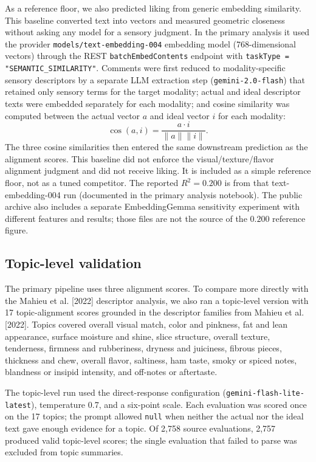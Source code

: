 \documentclass[11pt]{article}
\begin{document}
As a reference floor, we also predicted liking from generic embedding
similarity. This baseline converted text into vectors and measured geometric
closeness without asking any model for a sensory judgment. In the primary
analysis it used the provider \texttt{models/text-embedding-004} embedding
model (768-dimensional vectors) through the REST
\texttt{batchEmbedContents} endpoint with
\texttt{taskType = "SEMANTIC\_SIMILARITY"}. Comments were first reduced to
modality-specific sensory descriptors by a separate LLM extraction step
(\texttt{gemini-2.0-flash}) that retained only sensory terms for the target
modality; actual and ideal descriptor texts were embedded separately for each
modality; and cosine similarity was computed between the actual vector $a$ and
ideal vector $i$ for each modality:
\[
\cos(a,i) = \frac{a \cdot i}{\lVert a \rVert \lVert i \rVert}.
\]
The three cosine similarities then entered the same downstream prediction as
the alignment scores. This baseline did not enforce the visual/texture/flavor
alignment judgment and did not receive liking. It is included as a simple
reference floor, not as a tuned competitor. The reported $R^2 = 0.200$ is from
that text-embedding-004 run (documented in the primary analysis notebook). The
public archive also includes a separate EmbeddingGemma sensitivity experiment
with different features and results; those files are not the source of the
$0.200$ reference figure.

\subsection{Topic-level validation}
\label{sec:topicmethods}

The primary pipeline uses three alignment scores. To compare more directly
with the Mahieu et al. [2022] descriptor analysis, we also ran a topic-level
version with 17 topic-alignment scores grounded in the descriptor families
from Mahieu et al. [2022]. Topics covered overall visual match, color and
pinkness, fat and lean appearance, surface moisture and shine, slice
structure, overall texture, tenderness, firmness and rubberiness, dryness and
juiciness, fibrous pieces, thickness and chew, overall flavor, saltiness, ham
taste, smoky or spiced notes, blandness or insipid intensity, and off-notes or
aftertaste.

The topic-level run used the direct-response configuration
(\texttt{gemini-flash-lite-latest}), temperature 0.7, and a six-point scale.
Each evaluation was scored once on the 17 topics; the prompt allowed
\texttt{null} when neither the actual nor the ideal text gave enough evidence
for a topic. Of 2,758 source evaluations, 2,757 produced valid topic-level
scores; the single evaluation that failed to parse was excluded from topic
summaries.
\end{document}
